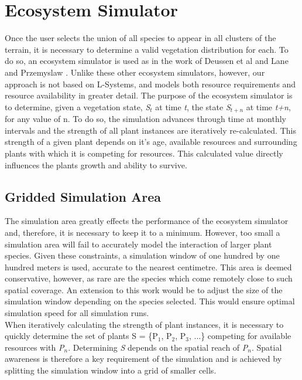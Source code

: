 \section{Ecosystem Simulator} \label{sec:ecosystem_simulator}

Once the user selects the union of all species to appear in all clusters of the terrain, it is necessary to determine a valid vegetation distribution for each. To do so, an ecosystem simulator is used as in the work of Deussen et al \cite{Deussen1998} and Lane and Przemyslaw \cite{Lane2002}. Unlike these other ecosystem simulators, however, our approach is not based on L-Systems, and models both resource requirements and resource availability in greater detail. The purpose of the ecosystem simulator is to determine, given a vegetation state, \textit{S$_{t}$} at time \textit{t}, the state \textit{S$_{t+n}$} at time \textit{t+n}, for any value of n. To do so, the simulation advances through time at monthly intervals and the strength of all plant instances are iteratively re-calculated. This strength of a given plant depends on it's age, available resources and surrounding plants with which it is competing for resources. This calculated value directly influences the plants growth and ability to survive.\\

\subsection{Gridded Simulation Area}

The simulation area greatly effects the performance of the ecosystem simulator and, therefore, it is necessary to keep it to a minimum. However, too small a simulation area will fail to accurately model the interaction of larger plant species. Given these constraints, a simulation window of one hundred by one hundred meters is used, accurate to the nearest centimetre. This area is deemed conservative, however, as rare are the species which come remotely close to such spatial coverage. An extension to this work would be to adjust the size of the simulation window depending on the  species selected. This would ensure optimal simulation speed for all simulation runs. \\

When iteratively calculating the strength of plant instances, it is necessary to quickly determine the set of plants S = \{P$_{1}$, P$_{2}$, P$_{3}$, ...\} competing for available resources with \textit{P$_{n}$}. Determining \textit{S} depends on the spatial reach of \textit{P$_{n}$}. Spatial awareness is therefore a key requirement of the simulation and is achieved by splitting the simulation window into a grid of smaller cells. \\

